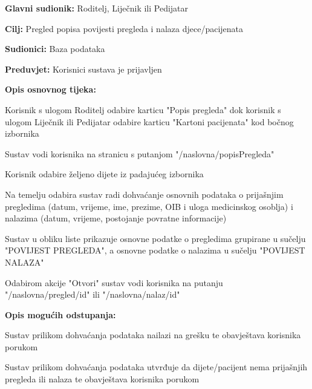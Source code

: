 				
				\noindent {}
				\begin{packed_item}
					
					\item \textbf{Glavni sudionik: }Roditelj, Liječnik ili Pedijatar
					\item  \textbf{Cilj:} Pregled popisa povijesti pregleda i nalaza djece/pacijenata
					\item  \textbf{Sudionici:} Baza podataka
					\item  \textbf{Preduvjet:} Korisnici sustava je prijavljen
					\item  \textbf{Opis osnovnog tijeka:}
					
					\item[] \begin{packed_enum}
						\item Korisnik s ulogom Roditelj odabire karticu "Popis pregleda" dok korisnik s ulogom Liječnik ili Pedijatar odabire karticu "Kartoni pacijenata" kod bočnog izbornika
						\item Sustav vodi korisnika na stranicu s putanjom "/naslovna/popisPregleda"
						\item Korisnik odabire željeno dijete iz padajućeg izbornika
						\item Na temelju odabira sustav radi dohvaćanje osnovnih podataka o prijašnjim pregledima (datum, vrijeme, ime, prezime, OIB i uloga medicinskog osoblja) i nalazima (datum, vrijeme, postojanje povratne informacije)
						\item Sustav u obliku liste prikazuje osnovne podatke o pregledima grupirane u sučelju "POVIJEST PREGLEDA", a osnovne podatke o nalazima u sučelju "POVIJEST NALAZA"
						\item Odabirom akcije "Otvori" sustav vodi korisnika na putanju "/naslovna/pregled/id" ili "/naslovna/nalaz/id"
					\end{packed_enum}
					
						\item  \textbf{Opis mogućih odstupanja:}
					
					\item[] \begin{packed_item}
						
						\item[4.a] Sustav prilikom dohvaćanja podataka nailazi na grešku te obavještava korisnika porukom
						
						\item[4.b] Sustav prilikom dohvaćanja podataka utvrđuje da dijete/pacijent nema prijašnjih pregleda ili nalaza te obavještava korisnika porukom					
					\end{packed_item}
					
				\end{packed_item}
				
